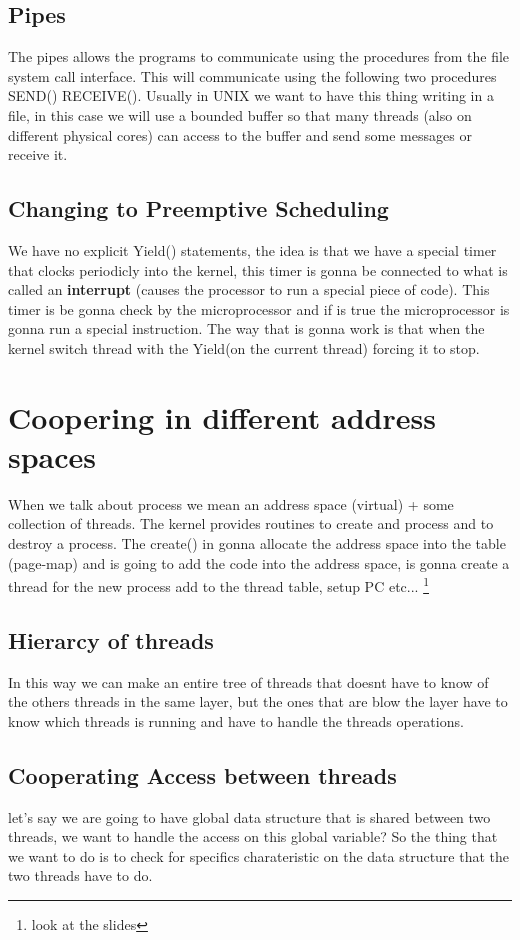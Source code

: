 \documentclass{article}
\begin{document}
    \subsection{Pipes}
      The pipes allows the programs to communicate using the procedures from the file system
      call interface. This will communicate using the following two procedures SEND() RECEIVE().
      Usually in UNIX we want to have this thing writing in a file, in this case we will
      use a bounded buffer so that many threads (also on different physical cores) can
      access to the buffer and send some messages or receive it.
    \subsection{Changing to Preemptive Scheduling} We have no explicit Yield() statements, 
      the idea is that we have a special timer that clocks periodicly into the kernel, this
      timer is gonna be connected to what is called an \textbf{interrupt} (causes the processor to run
      a special piece of code). This timer is be gonna check by the microprocessor and if is
      true the microprocessor is gonna run a special instruction. The way that is gonna work 
      is that when the kernel switch thread with the Yield(on the current thread) forcing it
      to stop.
  \section{Coopering in different address spaces} When we talk about process we mean an address
    space (virtual) + some collection of threads. The kernel provides routines to create and
    process and to destroy a process. The create() in gonna allocate the address space into 
    the table (page-map) and is going to add the code into the address space, is gonna create
    a thread for the new process add to the thread table, setup PC etc... \footnote{look at the
    slides}
    \subsection{Hierarcy of threads} In this way we can make an entire tree of threads that 
      doesnt have to know of the others threads in the same layer, but the ones that are blow 
      the layer have to know which threads is running and have to handle the threads operations.
    \subsection{Cooperating Access between threads} let's say we are going to have global
      data structure that is shared between two threads, we want to handle the access on
      this global variable? So the thing that we want to do is to check for specifics 
      charateristic on the data structure that the two threads have to do.
\end{document}
